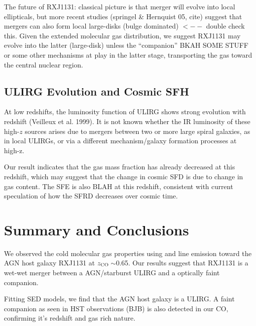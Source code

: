 \documentclass[]{emulateapj}
\begin{document}
The future of RXJ1131:
classical picture is that merger will evolve into local ellipticals, but more
recent studies (springel \& Hernquist 05, cite) suggest that mergers can also
form local large-disks (bulge dominated) $<--$ double check this. Given the
extended molecular gas distribution, we suggest RXJ1131 may evolve into the
latter (large-disk) unless the ``companion'' BKAH SOME STUFF or some other
mechanisms at play in the latter stage, transporting the gas
toward the central nuclear region.

\subsection{ULIRG Evolution and Cosmic SFH}
At low redshifts, the luminosity function of ULIRG shows strong evolution with
redshift (Veilleux et al. 1999). It is not known whether the IR luminosity of
these high-$z$ sources arises due to mergers between two or more large spiral
galaxies, as in local ULIRGs, or via a different mechanism/galaxy formation
processes at high-z.


Our result indicates that the gas mass fraction has already decreased
at this redshift, which may suggest that the change in cosmic SFD is due to
change in gas content. The SFE is also BLAH at this redshift,
consistent with current speculation of how the SFRD decreases over cosmic time.

\section{Summary and Conclusions}


We observed the cold molecular gas properties using \bco and \cco line emission
toward the AGN host galaxy RXJ1131 at $z_{\rm CO}$\,$\sim$0.65.
Our results suggest that RXJ1131 is a wet-wet merger between a AGN/starburst
ULIRG and a optically faint companion.

Fitting SED models, we find that the AGN host galaxy is a ULIRG.
A faint companion as seen in HST observations (BJB) is also detected in our CO, confirming it's redshift and gas rich nature.
\end{document}
